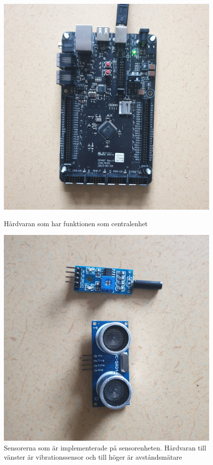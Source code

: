 \documentclass{article}
\begin{document}
\begin{figure}[!tbp]
    \centering
     \begin{minipage}[b]{0.3\textwidth}
    \includegraphics[scale=0.05]{Projektrapport/central.png}
    \caption {Hårdvaran som har funktionen som centralenhet}
    \end{minipage}
    \hfill
    \begin{minipage}[b]{0.5\textwidth}
    \includegraphics[scale=0.04]{Projektrapport/sensor.png}
    \caption {Sensorerna som är implementerade på sensorenheten. Hårdvaran till vänster är vibrationssensor och till höger är avståndsmätare}
    \end{minipage}
    \label{fig:drawing}
\end{figure}
\end{document}
